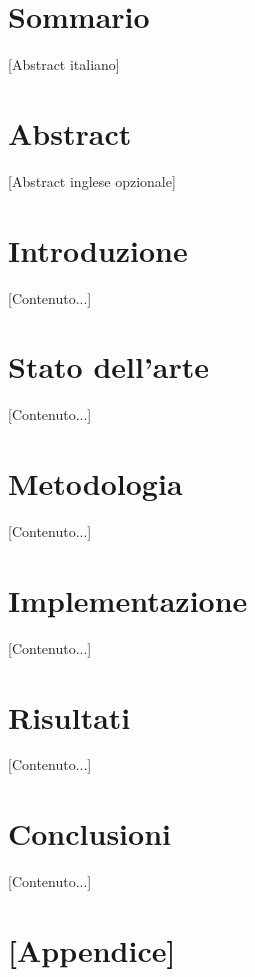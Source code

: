 \documentclass[12pt,a4paper,twoside,openright]{report}
\begin{document}
\chapter*{Sommario}
[Abstract italiano]

\chapter*{Abstract}
[Abstract inglese opzionale]

\tableofcontents
\listoffigures
\listoftables

\chapter{Introduzione}
[Contenuto...]

\chapter{Stato dell'arte}
[Contenuto...]

\chapter{Metodologia}
[Contenuto...]

\chapter{Implementazione}
[Contenuto...]

\chapter{Risultati}
[Contenuto...]

\chapter{Conclusioni}
[Contenuto...]

\printbibliography[heading=bibintoc, title={Bibliografia}]

\appendix
\chapter{[Appendice]}
\end{document}
